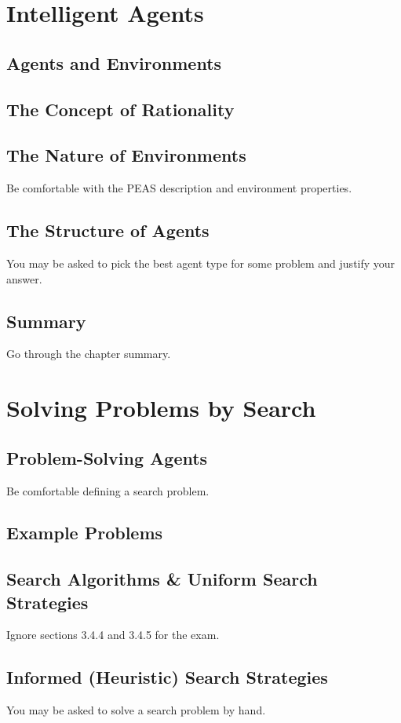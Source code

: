 \documentclass[exam={Midterm}]{cs581exam}
\begin{document}
\section{Intelligent Agents}\label{sec:intelligent-agents}
\subsection{Agents and Environments}\label{subsec:2.1}
\subsection{The Concept of Rationality}\label{subsec:2.2}
\subsection{The Nature of Environments}\label{subsec:2.3}
Be comfortable with the PEAS description and environment properties.
\subsection{The Structure of Agents}\label{subsec:2.4}
You may be asked to pick the best agent type for some problem and justify
your answer.
\subsection{Summary}\label{subsec:2-summary}
Go through the chapter summary.

\section{Solving Problems by Search}\label{sec:solving-problems-by-search}
\subsection{Problem-Solving Agents}\label{subsec:3.1}
Be comfortable defining a search problem.
\subsection{Example Problems}\label{subsec:3.2}
\subsection{Search Algorithms \& Uniform Search Strategies}\label{subsec:3.3-4}
Ignore sections 3.4.4 and 3.4.5 for the exam.
\setcounter{subsection}{4}%
\subsection{Informed (Heuristic) Search Strategies}\label{subsec:3.5}
You may be asked to solve a search problem by hand.
\end{document}
